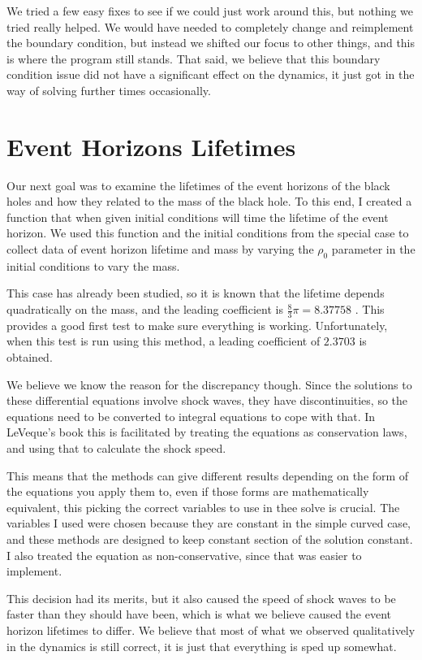 \documentclass[12pt]{article}
\begin{document}
We tried a few easy fixes to see if we could just work around this, but nothing we tried
really helped. We would have needed to completely change and reimplement the boundary
condition, but instead we shifted our focus to other things, and this is where the
program still stands. That said, we believe that this boundary condition issue did not
have a significant effect on the dynamics, it just got in the way of solving further
times occasionally.

\section{Event Horizons Lifetimes}

Our next goal was to examine the lifetimes of the event horizons of the black holes and
how they related to the mass of the black hole. To this end, I created a function that
when given initial conditions will time the lifetime of the event horizon. We used this
function and the initial conditions from the special case to collect data of event
horizon lifetime and mass by varying the $\rho_0$ parameter in the initial conditions to
vary the mass.

This case has already been studied, so it is known that the lifetime depends
quadratically on the mass, and the leading coefficient is $\frac{8}{3}\pi = 8.37758$
\cite{lqg2}. This provides a good first test to make sure everything is working.
Unfortunately, when this test is run using this method, a leading coefficient of
$2.3703$ is obtained.

We believe we know the reason for the discrepancy though. Since the solutions to these
differential equations involve shock waves, they have discontinuities, so the equations
need to be converted to integral equations to cope with that. In LeVeque's book this is
facilitated by treating the equations as conservation laws, and using that to calculate
the shock speed.

This means that the methods can give different results depending on the form of the
equations you apply them to, even if those forms are mathematically equivalent, this
picking the correct variables to use in thee solve is crucial. The variables I used were
chosen because they are constant in the simple curved case, and these methods are
designed to keep constant section of the solution constant. I also treated the equation
as non-conservative, since that was easier to implement.

This decision had its merits, but it also caused the speed of shock waves to be faster
than they should have been, which is what we believe caused the event horizon lifetimes
to differ. We believe that most of what we observed qualitatively in the dynamics is
still correct, it is just that everything is sped up somewhat.
\end{document}
